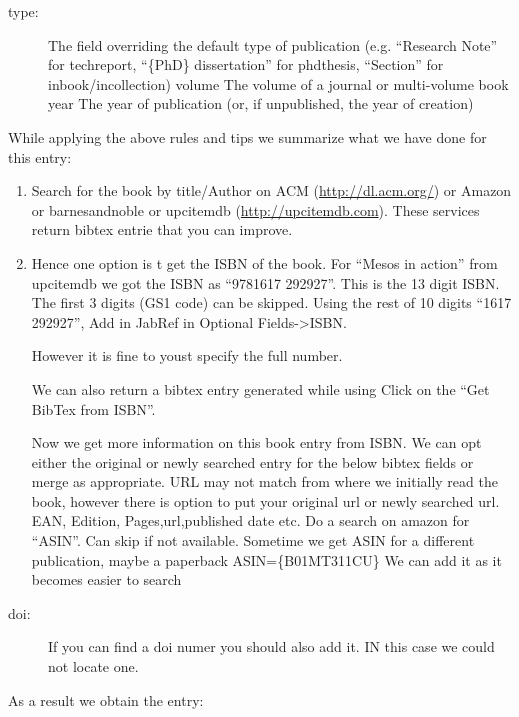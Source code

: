 \begin{description}
\item[{type:}] \leavevmode
The field overriding the default type of publication (e.g. ``Research
Note'' for techreport, ``\{PhD\} dissertation'' for phdthesis, ``Section''
for inbook/incollection) volume The volume of a journal or
multi-volume book year The year of publication (or, if unpublished,
the year of creation)

\end{description}

While applying the above rules and tips we summarize what we have done
for this entry:
\begin{enumerate}
\item {} 
Search for the book by title/Author on ACM (\url{http://dl.acm.org/}) or Amazon or
barnesandnoble or upcitemdb (\url{http://upcitemdb.com}). These services
return bibtex entrie that you can improve.

\item {} 
Hence one option is t get the ISBN of the book. For ``Mesos in
action'' from upcitemdb we
got the ISBN as ``9781617 292927''. This is the 13 digit ISBN. The first
3 digits (GS1 code) can be skipped.
Using the rest of 10 digits ``1617 292927'', Add in JabRef in Optional
Fields-\textgreater{}ISBN.

However it is fine to youst specify the full number.

We can also return a bibtex entry generated while using
Click on the ``Get BibTex from ISBN''.

Now we get more information on this book entry from ISBN. We can
opt either the original or newly searched entry for the below
bibtex fields or merge as appropriate. URL may not match from where we
initially read the book, however there is option to put your original
url or newly searched url. EAN, Edition, Pages,url,published date etc.
Do a search on amazon for ``ASIN''. Can skip if not available. Sometime
we get ASIN for a different publication, maybe a paperback
ASIN=\{B01MT311CU\} We can add it as it becomes easier to search

\end{enumerate}
\begin{description}
\item[{doi:}] \leavevmode
If you can find a doi numer you should also add it. IN this case we
could not locate one.

\end{description}

As a result we obtain the entry:

